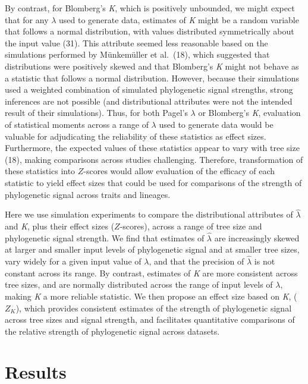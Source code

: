 \documentclass[9pt,twocolumn,twoside,lineno]{pnas-new}
\begin{document}
By contrast, for Blomberg's \emph{K}, which is positively unbounded, we
might expect that for any \(\lambda\) used to generate data, estimates
of \emph{K} might be a random variable that follows a normal
distribution, with values distributed symmetrically about the input
value (31). This attribute seemed less reasonable based on the
simulations performed by Münkemüller et al.~(18), which suggested that
distributions were positively skewed and that Blomberg's \emph{K} might
not behave as a statistic that follows a normal distribution. However,
because their simulations used a weighted combination of simulated
phylogenetic signal strengths, strong inferences are not possible (and
distributional attributes were not the intended result of their
simulations). Thus, for both Pagel's \(\lambda\) or Blomberg's \emph{K},
evaluation of statistical moments across a range of \(\lambda\) used to
generate data would be valuable for adjudicating the reliability of
these statistics as effect sizes. Furthermore, the expected values of
these statistics appear to vary with tree size (18), making comparisons
across studies challenging. Therefore, transformation of these
statistics into \(Z\)-scores would allow evaluation of the efficacy of
each statistic to yield effect sizes that could be used for comparisons
of the strength of phylogenetic signal across traits and lineages.

Here we use simulation experiments to compare the distributional
attributes of \(\hat{\lambda}\) and \emph{K}, plus their effect sizes
(\(Z\)-scores), across a range of tree size and phylogenetic signal
strength. We find that estimates of \(\hat{\lambda}\) are increasingly
skewed at larger and smaller input levels of phylogenetic signal and at
smaller tree sizes, vary widely for a given input value of \(\lambda\),
and that the precision of \(\hat{\lambda}\) is not constant across its
range. By contrast, estimates of \emph{K} are more consistent across
tree sizes, and are normally distributed across the range of input
levels of \(\lambda\), making \emph{K} a more reliable statistic. We
then propose an effect size based on \emph{K}, (\(Z_K\)), which provides
consistent estimates of the strength of phylogenetic signal across tree
sizes and signal strength, and facilitates quantitative comparisons of
the relative strength of phylogenetic signal across datasets.

\hypertarget{results}{%
\section{Results}\label{results}}
\end{document}

